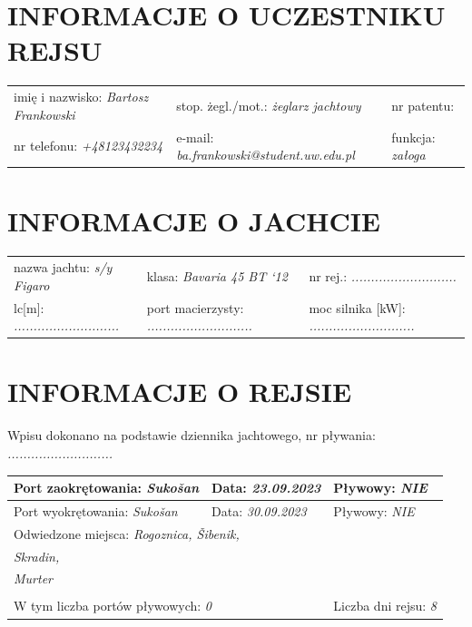 \documentclass{article}
\begin{document}
\section*{INFORMACJE O UCZESTNIKU REJSU}
\begin{tabularx}{\textwidth}{X X X}
imię i nazwisko: \textit{Bartosz Frankowski} & stop. żegl./mot.: \textit{żeglarz jachtowy} & nr patentu: \textit{ } \\
nr telefonu: \textit{+48123432234} & e-mail: \textit{ba.frankowski@student.uw.edu.pl} & funkcja: \textit{załoga} \\
\end{tabularx}

\section*{INFORMACJE O JACHCIE}

\begin{tabularx}{\textwidth}{X X X}
nazwa jachtu: \textit{s/y Figaro} & klasa: \textit{Bavaria 45 BT ‘12} & nr rej.: \textit{...........................} \\
lc[m]: \textit{...........................} & port macierzysty: \textit{...........................} & moc silnika [kW]: \textit{...........................} \\
\end{tabularx}

\section*{INFORMACJE O REJSIE}

Wpisu dokonano na podstawie dziennika jachtowego, nr pływania: \textit{...........................}
\\

\begin{tabularx}{\textwidth}{|X|X|X|}
\hline
Port zaokrętowania: \textit{Sukošan} & Data: \textit{23.09.2023} & Pływowy: \textit{NIE} \\
\hline
Port wyokrętowania: \textit{Sukošan} & Data: \textit{30.09.2023} & Pływowy: \textit{NIE} \\
\hline
\multicolumn{3}{|l|}{Odwiedzone miejsca:
\textit{Rogoznica, Šibenik,}\dotfill}\\
\multicolumn{3}{|l|}{\textit{ Skradin,}\dotfill} \\
\multicolumn{3}{|l|}{\textit{ Murter}\dotfill} \\
\multicolumn{3}{|l|}{\dotfill} \\
\hline
\multicolumn{2}{|l|}{W tym liczba portów pływowych: \textit{0}} & Liczba dni rejsu: \textit{8}\\
\hline
\end{tabularx}
\\\\
\end{document}
